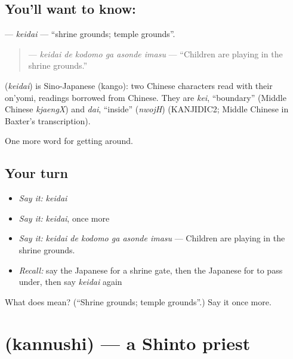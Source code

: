 \subsection*{You'll want to know: }
\textbf{} — \emph{keidai} — \textquotedblleft{}shrine grounds; temple grounds\textquotedblright{}.

\begin{quote}
\textbf{  } — \emph{keidai de kodomo ga asonde imasu} — \textquotedblleft{}Children are playing in the shrine grounds.\textquotedblright{}
\end{quote}

\begin{cousinweb}
\textbf{} (\emph{keidai}) is Sino-Japanese (kango): two Chinese characters read with their on'yomi, readings borrowed from Chinese. They are \emph{kei}, \textquotedblleft{}boundary\textquotedblright{} (Middle Chinese \emph{kjaengX}) and \emph{dai}, \textquotedblleft{}inside\textquotedblright{} (\emph{nwojH}) (KANJIDIC2; Middle Chinese in Baxter's transcription).
\end{cousinweb}

\begin{grammarlens}[title={What you've built}]
One more word for getting around.
\end{grammarlens}

\subsection*{Your turn}
\begin{itemize}
\raggedright
  \item \emph{Say it:} \emph{keidai}
  \item \emph{Say it:} \emph{keidai}, once more
  \item \emph{Say it:} \emph{keidai de kodomo ga asonde imasu} — Children are playing in the shrine grounds.
  \item \emph{Recall:} say the Japanese for a shrine gate, then the Japanese for to pass under, then say \emph{keidai} again
\end{itemize}

\begin{tcolorbox}[breakable,colback=teal!4,colframe=teal!35!black,title={Before you move on}]
What does  mean? (\textquotedblleft{}Shrine grounds; temple grounds\textquotedblright{}.) Say it once more.
\end{tcolorbox}
\section[\texorpdfstring{\ja{かんぬし} (kannushi)}{かんぬし (kannushi)}]{ (kannushi) — a Shinto priest}

